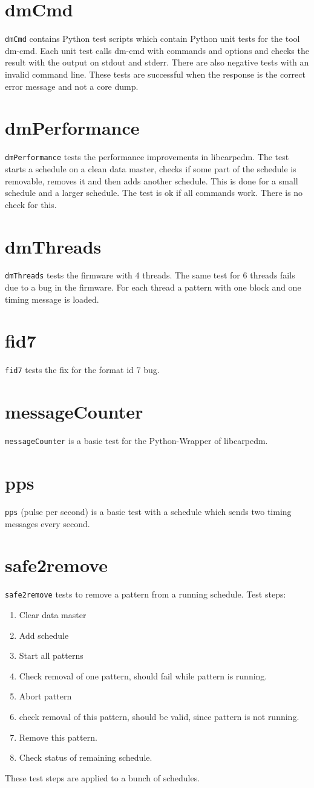 \documentclass[12pt,a4paper]{report}
\begin{document}
\section{dmCmd}
\texttt{dmCmd} contains Python test scripts which contain Python unit tests for the tool dm-cmd. Each unit test calls dm-cmd
with commands and options and checks the result with the output on stdout and stderr. There are also negative tests with an invalid command
line. These tests are successful when the response is the correct error message and not a core dump.
\section{dmPerformance}
\texttt{dmPerformance} tests the performance improvements in libcarpedm.
The test starts a schedule on a clean data master, checks if some part of the schedule is removable, removes it and
then adds another schedule. This is done for a small schedule and a larger schedule. The test is ok if all commands
work. There is no check for this.
\section{dmThreads}
\texttt{dmThreads} tests the firmware with 4 threads. The same test for 6 threads fails due to a bug in the
firmware. For each thread a pattern with one block and one timing message is loaded.
\section{fid7}
\texttt{fid7} tests the fix for the format id 7 bug.

\section{messageCounter}
\texttt{messageCounter} is a basic test for the Python-Wrapper of libcarpedm.
\section{pps}
\texttt{pps} (pulse per second) is a basic test with a schedule which sends two timing messages every second.
\section{safe2remove}
\texttt{safe2remove} tests to remove a pattern from a running schedule. Test steps:
\begin{enumerate}
\item Clear data master
\item Add schedule
\item Start all patterns
\item Check removal of one pattern, should fail while pattern is running.
\item Abort pattern
\item check removal of this pattern, should be valid, since pattern is not running.
\item Remove this pattern.
\item Check status of remaining schedule.
\end{enumerate}
These test steps are applied to a bunch of schedules.

\end{document}
